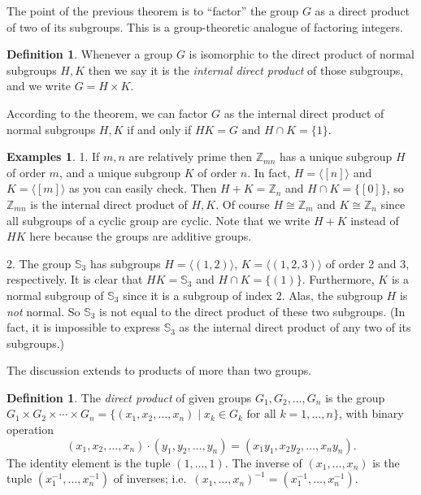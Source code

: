 \documentclass[11pt,oneside]{article}
\theoremstyle{definition}
\newtheorem{defn}[thm]{Definition}
\newtheorem{examples}[thm]{Examples}
\newcommand{\Z}{\mathbb{Z}} %
\newcommand{\gen}[1]{\langle #1 \rangle}
\newcommand{\Sym}{\mathbb{S}}
\begin{document}
The point of the previous theorem is to ``factor'' the group $G$ as a
direct product of two of its subgroups. This is a group-theoretic
analogue of factoring integers. 

\begin{defn}
  Whenever a group $G$ is isomorphic to the direct product of normal
  subgroups $H, K$ then we say it is the \emph{internal direct
    product} of those subgroups, and we write $G = H \times K$.
\end{defn}

According to the theorem, we can factor $G$ as the internal direct
product of normal subgroups $H,K$ if and only if $HK = G$ and $H \cap
K = \{1\}$.

\begin{examples}
1. If $m,n$ are relatively prime then $\Z_{mn}$ has a unique subgroup
$H$ of order $m$, and a unique subgroup $K$ of order $n$. In fact, $H
= \gen{[n]}$ and $K = \gen{[m]}$ as you can easily check. Then $H+K =
\Z_n$ and $H \cap K = \{[0]\}$, so $\Z_{mn}$ is the internal direct
product of $H, K$. Of course $H \cong \Z_m$ and $K \cong \Z_n$ since
all subgroups of a cyclic group are cyclic. Note that we write $ H+K$
instead of $HK$ here because the groups are additive groups.

2. The group $\Sym_3$ has subgroups $H = \gen{(1,2)}$, $K =
\gen{(1,2,3)}$ of order 2 and 3, respectively. It is clear that $HK =
\Sym_3$ and $H \cap K = \{(1)\}$. Furthermore, $K$ is a normal
subgroup of $\Sym_3$ since it is a subgroup of index 2.  Alas, the
subgroup $H$ is \emph{not} normal. So $\Sym_3$ is not equal to the
direct product of these two subgroups. (In fact, it is impossible to
express $\Sym_3$ as the internal direct product of any two of its
subgroups.)
\end{examples}

The discussion extends to products of more than two groups. 

\begin{defn}\label{def:gen-prod} 
  The \emph{direct product} of given groups $G_1, G_2, \dots, G_n$ is
  the group $G_1 \times G_2 \times \cdots \times G_n = \{ (x_1, x_2,
  \dots, x_n) \mid x_k \in G_k \text{ for all } k = 1, \dots, n \}$,
  with binary operation
  \[
    (x_1, x_2, \dots, x_n) \cdot (y_1, y_2, \dots, y_n) = (x_1y_1,
  x_2y_2, \dots, x_ny_n).
  \]
  The identity element is the tuple $(1, \dots, 1)$.  The inverse of
  $(x_1, \dots, x_n)$ is the tuple $(x_1^{-1}, \dots, x_n^{-1})$ of
  inverses; i.e.\ $(x_1, \dots, x_n)^{-1} = (x_1^{-1}, \dots,
  x_n^{-1})$.
\end{defn}
\end{document}
